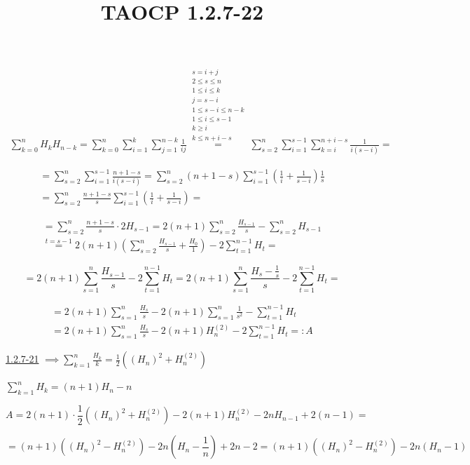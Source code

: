\documentclass{article}
\title{TAOCP 1.2.7\mbox{-}22}
\begin{document}
\maketitle

\begin{multline*}
\sum_{k=0}^{n} H_{k}H_{n-k} = \sum_{k=0}^{n} \sum_{i=1}^{k} \sum_{j=1}^{n-k} \frac{1}{ij} \overset{\substack{s=i+j\\2 \leq s \leq n\\1 \leq i \leq k\\j = s - i\\1 \leq s -i \leq n-k\\1\leq i \leq s -1\\k \geq i\\k \leq n+i-s }}{=} \sum_{s=2}^{n} \sum_{i=1}^{s-1} \sum_{k=i}^{n+i-s}\frac{1}{i(s-i)} =
\end{multline*}

\begin{multline*}
= \sum_{s=2}^{n}\sum_{i=1}^{s-1} \frac{n+1-s}{i(s-i)} = \sum_{s=2}^{n} (n+1-s) \sum_{i=1}^{s-1} (\frac{1}{i} + \frac{1}{s-i})\frac{1}{s} \\
= \sum_{s=2}^{n} \frac{n+1-s}{s}\sum_{i=1}^{s-1}(\frac{1}{i} + \frac{1}{s-i}) =
\end{multline*}

\begin{multline*}
= \sum_{s=2}^{n} \frac{n+1-s}{s} \cdot 2H_{s-1} = 2(n+1) \sum_{s=2}^{n} \frac{H_{s-1}}{s} - \sum_{s=2}^{n} H_{s-1} \\
\overset{t=s-1}{=} 2(n+1) (\sum_{s=2}^{n} \frac{H_{s-1}}{s} + \frac{H_{0}}{1}) - 2\sum_{t=1}^{n-1} H_{t} =
\end{multline*}

\[ = 2(n+1)\sum_{s=1}^{n}\frac{H_{s-1}}{s} - 2\sum_{t=1}^{n-1} H_{t} = 2(n+1)\sum_{s=1}^{n}\frac{H_{s} - \frac{1}{s}}{s} - 2\sum_{t=1}^{n-1} H_{t} = \]

\begin{multline*}
= 2(n+1)\sum_{s=1}^{n}\frac{H_{s}}{s} - 2(n+1)\sum_{s=1}^{n} \frac{1}{s^{2}} - \sum_{t=1}^{n-1} H_{t} \\
= 2(n+1)\sum_{s=1}^{n}\frac{H_{s}}{s} - 2(n+1)H_{n}^{(2)} - 2\sum_{t=1}^{n-1} H_{t} =: A
\end{multline*}

\href{./1.2.7-21.pdf}{1.2.7\mbox{-}21} \( \implies \sum_{k=1}^{n} \frac{H_{k}}{k} = \frac{1}{2}({(H_{n})}^{2} + H_{n}^{(2)}) \)

\( \sum_{k=1}^{n} H_{k} = (n+1)H_{n} - n \)

\[ A = 2(n+1)\cdot \frac{1}{2}({(H_{n})}^{2} + H_{n}^{(2)}) - 2(n+1)H_{n}^{(2)} - 2nH_{n-1} + 2(n - 1) = \]

\[ = (n+1)({(H_{n})}^{2} - H_{n}^{(2)}) - 2n(H_{n} - \frac{1}{n}) + 2n - 2 = (n+1)({(H_{n})}^{2} - H_{n}^{(2)}) - 2n(H_{n} - 1) \]
\end{document}
